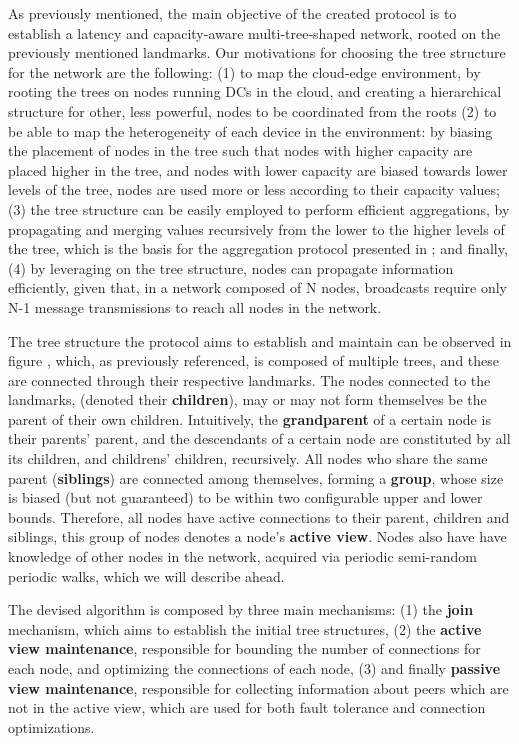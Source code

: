 As previously mentioned, the main objective of the created protocol is to establish a latency and capacity-aware multi-tree-shaped network, rooted on the previously mentioned landmarks. Our motivations for choosing the tree structure for the network are the following: (1) to map the cloud-edge environment, by rooting the trees on nodes running DCs in the cloud, and creating a hierarchical structure for other, less powerful, nodes to be coordinated from the roots  (2) to be able to map the heterogeneity of each device in the environment: by biasing the placement of nodes in the tree such that nodes with higher capacity are placed higher in the tree, and nodes with lower capacity are biased towards lower levels of the tree, nodes are used more or less according to their capacity values; (3) the tree structure can be easily employed to perform efficient aggregations, by propagating and merging values recursively from the lower to the higher levels of the tree, which is the basis for the aggregation protocol presented in ; and finally, (4) by leveraging on the tree structure, nodes can propagate information efficiently, given that, in a network composed of N nodes, broadcasts require only N-1 message transmissions to reach all nodes in the network. 

The tree structure the protocol aims to establish and maintain can be observed in figure , which, as previously referenced, is composed of multiple trees, and these are connected through their respective landmarks. The nodes connected to the landmarks, (denoted their \textbf{children}), may or may not form themselves be the parent of their own children. Intuitively, the \textbf{grandparent} of a certain node is their parents' parent, and the descendants of a certain node are constituted by all its children, and childrens' children, recursively. All nodes who share the same parent (\textbf{siblings}) are connected among themselves, forming a \textbf{group}, whose size is biased (but not guaranteed) to be within two configurable upper and lower bounds. Therefore, all nodes have active connections to their parent, children and siblings, this group of nodes denotes a node's \textbf{active view}. Nodes also have have knowledge of other nodes in the network, acquired via periodic semi-random periodic walks, which we will describe ahead. 

The devised algorithm is composed by three main mechanisms: (1) the \textbf{join} mechanism, which aims to establish the initial tree structures, (2) the \textbf{active view maintenance}, responsible for bounding the number of connections for each node, and optimizing the connections of each node, (3)  and finally \textbf{passive view maintenance}, responsible for collecting information about peers which are not in the active view, which are used for both fault tolerance and connection optimizations.

